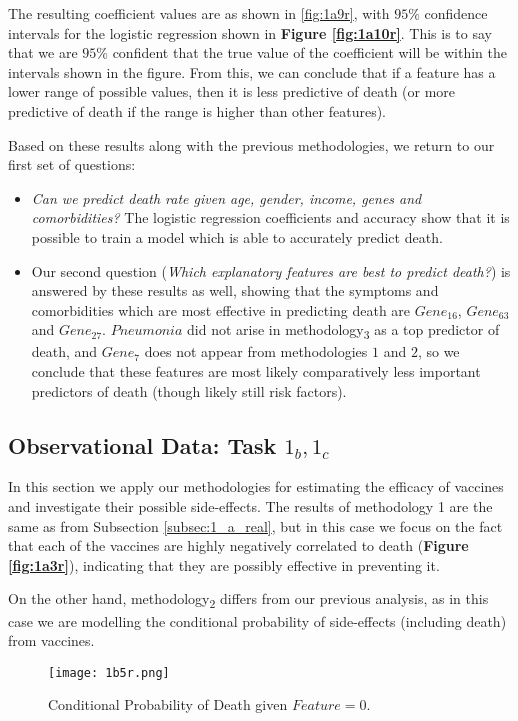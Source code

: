 The resulting coefficient values are as shown in \ref{fig:1a9r}, with $95\%$ confidence intervals for the logistic regression shown in \textbf{Figure \ref{fig:1a10r}}. This is to say that we are $95\%$ confident that the true value of the coefficient will be within the intervals shown in the figure. From this, we can conclude that if a feature has a lower range of possible values, then it is less predictive of death (or more predictive of death if the range is higher than other features). 

Based on these results along with the previous methodologies, we return to our first set of questions:

\begin{itemize}
    \item \textit{Can we predict death rate given age, gender, income, genes and comorbidities?} 
The logistic regression coefficients and accuracy show that it is possible to train a model which is able to accurately predict death.

    \item Our second question (\textit{Which explanatory features are best to predict death?})
is answered by these results as well, showing that the symptoms and comorbidities which are most effective in predicting death are $Gene_{16}$, $Gene_{63}$ and $Gene_{27}$. $Pneumonia$ did not arise in methodology\textsubscript{3} as a top predictor of death, and $Gene_7$ does not appear from methodologies $1$ and $2$, so we conclude that these features are most likely comparatively less important predictors of death (though likely still risk factors).
\end{itemize}
 
\subsection{Observational Data: Task $1_b, 1_c$}
In this section we apply our methodologies for estimating the efficacy of vaccines and investigate their possible side-effects. The results of methodology 1 are the same as from Subsection \ref{subsec:1_a_real}, but in this case we focus on the fact that each of the vaccines are highly negatively correlated to death (\textbf{Figure \ref{fig:1a3r}}), indicating that they are possibly effective in preventing it.


On the other hand, methodology\textsubscript{2} differs from our previous analysis, as in this case we are modelling the conditional probability of side-effects (including death) from vaccines.
\graphicspath{{pictures/task1b/}}
\begin{figure}[H]
  \texttt{[image: 1b5r.png]}
  \caption{Conditional  Probability  of  Death  given $Feature = 0$.}
    \label{fig:1b5r}
\end{figure}

